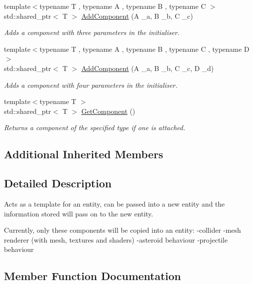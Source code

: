 \begin{DoxyCompactItemize}
{\footnotesize template$<$typename T , typename A , typename B , typename C $>$ }\\std\+::shared\+\_\+ptr$<$ T $>$ \hyperlink{classfrontier_1_1_prefab_a6c7f7106b06aa35137eb9edc37221f68}{Add\+Component} (A \+\_\+a, B \+\_\+b, C \+\_\+c)
\begin{DoxyCompactList}\small\item\em Adds a component with three parameters in the initialiser. \end{DoxyCompactList}\item 
{\footnotesize template$<$typename T , typename A , typename B , typename C , typename D $>$ }\\std\+::shared\+\_\+ptr$<$ T $>$ \hyperlink{classfrontier_1_1_prefab_abee1253ab0b10d162df0b7729916a441}{Add\+Component} (A \+\_\+a, B \+\_\+b, C \+\_\+c, D \+\_\+d)
\begin{DoxyCompactList}\small\item\em Adds a component with four parameters in the initialiser. \end{DoxyCompactList}\item 
{\footnotesize template$<$typename T $>$ }\\std\+::shared\+\_\+ptr$<$ T $>$ \hyperlink{classfrontier_1_1_prefab_a54eab9e949addd7f9ed382893d60a56c}{Get\+Component} ()
\begin{DoxyCompactList}\small\item\em Returns a component of the specified type if one is attached. \end{DoxyCompactList}\end{DoxyCompactItemize}
\subsection*{Additional Inherited Members}


\subsection{Detailed Description}
Acts as a template for an entity, can be passed into a new entity and the information stored will pass on to the new entity. 

Currently, only these components will be copied into an entity\+: -\/collider -\/mesh renderer (with mesh, textures and shaders) -\/asteroid behaviour -\/projectile behaviour 

\subsection{Member Function Documentation}
\mbox{\label{classfrontier_1_1_prefab_a3099b0a889fb31500c7620bf96d878a1}} 
